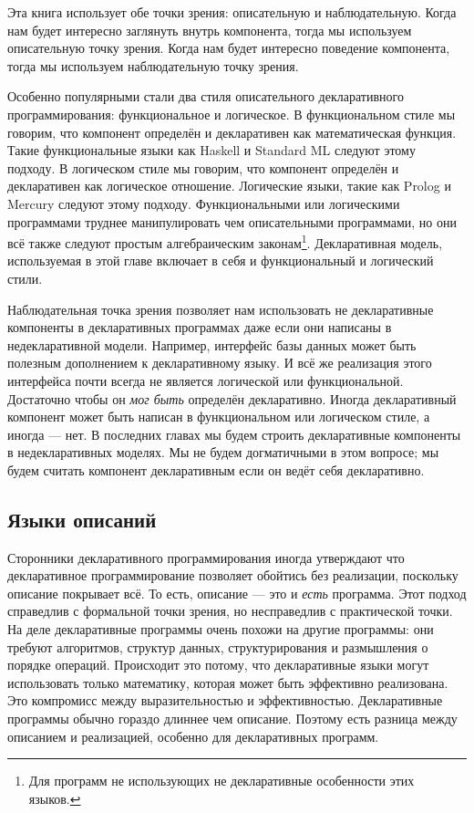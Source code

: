 Эта книга использует обе точки зрения: описательную и наблюдательную. Когда нам будет интересно заглянуть внутрь компонента, тогда мы используем описательную точку зрения. Когда нам будет интересно поведение компонента, тогда мы используем наблюдательную точку зрения.

Особенно популярными стали два стиля описательного декларативного программирования: функциональное и логическое. В функциональном стиле мы говорим, что компонент определён и декларативен как математическая функция. Такие функциональные языки как Haskell и Standard ML следуют этому подходу. В логическом стиле мы говорим, что компонент определён и декларативен как логическое отношение. Логические языки, такие как Prolog и Mercury следуют этому подходу. Функциональными или логическими программами труднее манипулировать чем описательными программами, но они всё также следуют простым алгебраическим законам\footnote{Для программ не использующих не декларативные особенности этих языков.}. Декларативная модель, используемая в этой главе включает в себя и функциональный и логический стили.

Наблюдательная точка зрения позволяет нам использовать не декларативные компоненты в декларативных программах даже если они написаны в недекларативной модели. Например, интерфейс базы данных может быть полезным дополнением к декларативному языку. И всё же реализация этого интерфейса почти всегда не является логической или функциональной. Достаточно чтобы он \emph{мог быть} определён декларативно. Иногда декларативный компонент может быть написан в функциональном или логическом стиле, а иногда --- нет. В последних главах мы будем строить декларативные компоненты в недекларативных моделях. Мы не будем догматичными в этом вопросе; мы будем считать компонент декларативным если он ведёт себя декларативно.

\subsection{Языки описаний}

Сторонники декларативного программирования иногда утверждают что декларативное программирование позволяет обойтись без реализации, поскольку описание покрывает всё. То есть, описание --- это и \emph{есть} программа. Этот подход справедлив с формальной точки зрения, но несправедлив с практической точки. На деле декларативные программы очень похожи на другие программы: они требуют алгоритмов, структур данных, структурирования и размышления о порядке операций. Происходит это потому, что декларативные языки могут использовать только математику, которая может быть эффективно реализована. Это компромисс между выразительностью и эффективностью. Декларативные программы обычно гораздо длиннее чем описание. Поэтому есть разница между описанием и реализацией, особенно для декларативных программ.

